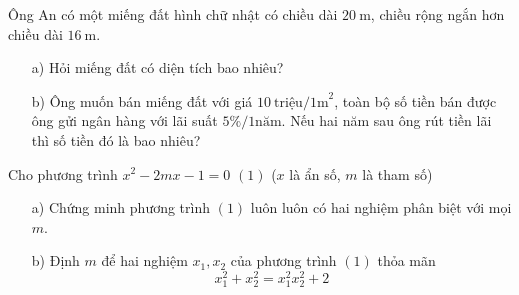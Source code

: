 \begin{ex}%
Ông An có một miếng đất hình chữ nhật có chiều dài $20~\mathrm{m}$, chiều rộng ngắn hơn chiều dài $16~\mathrm{m}$. 
\begin{enumerate}
\item[a)] Hỏi miếng đất có diện tích bao nhiêu?
\item[b)] Ông muốn bán miếng đất với giá $10~\textrm{triệu/1m}^2$, toàn bộ số tiền bán được ông gửi ngân hàng với lãi suất $5\%/\textrm{1năm}$. Nếu hai năm sau ông rút tiền lãi thì số tiền đó là bao nhiêu?
\end{enumerate}
\end{ex}

\begin{ex}%
Cho phương trình $x^2-2mx-1=0$ \quad $(1)$ ($x$ là ẩn số, $m$ là tham số)
\begin{enumerate}
\item[a)] Chứng  minh phương trình $(1)$ luôn luôn có hai nghiệm phân biệt với mọi $m$.
\item[b)] Định $m$ để hai nghiệm $x_1,x_2$ của phương trình $(1)$ thỏa mãn $$x_1^2+x_2^2=x_1^2x_2^2+2$$
\end{enumerate}
\end{ex}


